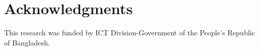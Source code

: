 \documentclass[12pt,a4paper]{article}
\begin{document}
\section{Acknowledgments}
This research was funded by ICT Division-Government of the People's Republic of Bangladesh.








\end{document}
